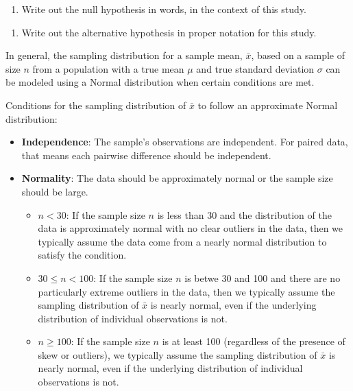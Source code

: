 \documentclass[
]{report}
\providecommand{\tightlist}{%
  \setlength{\itemsep}{0pt}\setlength{\parskip}{0pt}}
\begin{document}
\begin{enumerate}
\def\labelenumi{\arabic{enumi}.}
\setcounter{enumi}{1}
\tightlist
\item
  Write out the null hypothesis in words, in the context of this study.
\end{enumerate}

\vspace{0.8in}

\begin{enumerate}
\def\labelenumi{\arabic{enumi}.}
\setcounter{enumi}{2}
\tightlist
\item
  Write out the alternative hypothesis in proper notation for this study.
\end{enumerate}

\vspace{0.5in}

In general, the sampling distribution for a sample mean, \(\bar{x}\), based on a sample of size \(n\) from a population with a true mean \(\mu\) and true standard deviation \(\sigma\) can be modeled using a Normal distribution when certain conditions are met.

Conditions for the sampling distribution of \(\bar{x}\) to follow an approximate Normal distribution:

\begin{itemize}
\item
  \textbf{Independence}: The sample's observations are independent. For paired data, that means each pairwise difference should be independent.
\item
  \textbf{Normality}: The data should be approximately normal or the sample size should be large.

  \begin{itemize}
  \item
    \(n < 30\): If the sample size \(n\) is less than 30 and the distribution of the data is approximately normal with no clear outliers in the data, then we typically assume the data come from a nearly normal distribution to satisfy the condition.
  \item
    \(30 \leq n < 100\): If the sample size \(n\) is betwe 30 and 100 and there are no particularly extreme outliers in the data, then we typically assume the sampling distribution of \(\bar{x}\) is nearly normal, even if the underlying distribution of individual observations is not.
  \item
    \(n \geq 100\): If the sample size \(n\) is at least 100 (regardless of the presence of skew or outliers), we typically assume the sampling distribution of \(\bar{x}\) is nearly normal, even if the underlying distribution of individual observations is not.
  \end{itemize}
\end{itemize}
\end{document}
